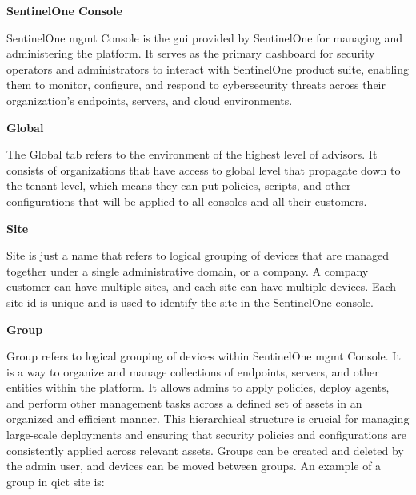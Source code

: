 \begin{multicols}{2}

      \textbf{SentinelOne Console}

      SentinelOne \acrshort{mgmt} Console is the \acrshort{gui} provided by SentinelOne for managing and administering the platform. It serves
      as the primary dashboard for security operators and administrators to interact with SentinelOne product suite, enabling them to monitor,
      configure, and respond to cybersecurity threats across their organization's endpoints, servers, and cloud environments.

      \textbf{Global}

      The Global tab refers to the environment of the highest level of advisors. It consists of organizations that have access to global level
      that propagate down to the tenant level, which means they can put policies, scripts, and other configurations that will be applied to all
      consoles and all their customers.

      \textbf{Site}

      Site is just a name that refers to logical grouping of devices that are managed together under a single administrative domain, or a company.
      A company customer can have multiple sites, and each site can have multiple devices. Each site \acrshort{id} is unique and is used to
      identify the site in the SentinelOne console.

      \textbf{Group}

      Group refers to logical grouping of devices within SentinelOne \acrshort{mgmt} Console.  It is a way to organize and manage collections
      of endpoints, servers, and other entities within the platform. It allows admins to apply policies, deploy agents, and perform other
      management tasks across a defined set of assets in an organized and efficient manner. This hierarchical structure is crucial for
      managing large-scale deployments and ensuring that security policies and configurations are consistently applied across relevant assets.
      Groups can be created and deleted by the admin user, and devices can be moved between groups. An example of a group in \acrshort{qict}
      site is:


\end{multicols}
